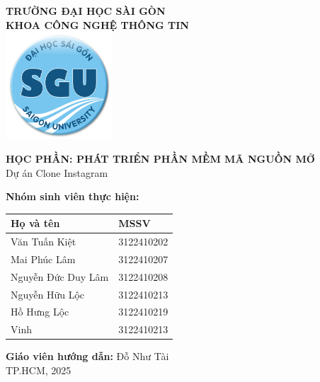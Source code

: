 \begin{titlepage}
    \centering
    {\LARGE \textbf{TRƯỜNG ĐẠI HỌC SÀI GÒN}} \\[0.2cm]
    {\Large \textbf{KHOA CÔNG NGHỆ THÔNG TIN}} \\[0.5cm]
    
    \vspace{0.5cm} 
    \includegraphics[width=4cm]{./img/logo.png} %
    \vspace{0.5cm} %
    
    {\Large \textbf{HỌC PHẦN: PHÁT TRIỂN PHẦN MỀM MÃ NGUỒN MỞ}} \\[0.5cm]
    {\Large Dự án Clone Instagram} \\[0.5cm]

    \vspace{0.5cm} %
    
    \textbf{Nhóm sinh viên thực hiện:} \\[0.5cm]
    
    \begin{tabular}{|l|l|}
        \hline
        \textbf{Họ và tên} & \textbf{MSSV} \\ \hline
        Văn Tuấn Kiệt & 3122410202 \\ \hline
        Mai Phúc Lâm & 3122410207 \\ \hline
        Nguyễn Đức Duy Lâm & 3122410208 \\ \hline
        Nguyễn Hữu Lộc & 3122410213 \\ \hline
        Hồ Hưng Lộc & 3122410219 \\ \hline
        Vinh & 3122410213 \\ \hline
    \end{tabular}

    \vspace{0.5cm}

    \textbf{Giáo viên hướng dẫn:} Đỗ Như Tài \\[0.5cm]
    
    \vfill
    {\Large TP.HCM, 2025}
\end{titlepage}

